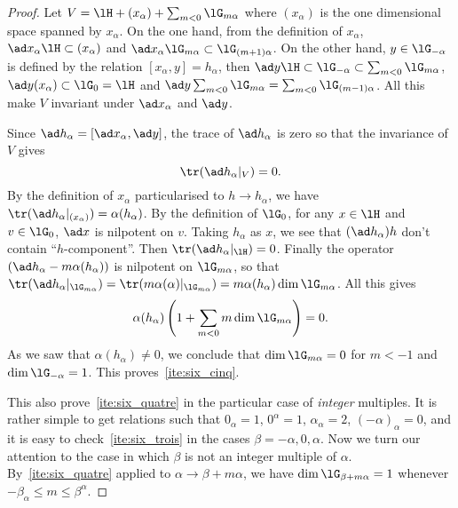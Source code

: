 \begin{proof}
Let $V=\lH+(x_{\alpha})+\sum_{m<0}\lG_{m\alpha}$ where $(x_{\alpha})$ is the one dimensional space spanned by $x_{\alpha}$. On the one hand,  from the definition of $x_{\alpha}$, $\ad x_{\alpha}\lH\subset(x_{\alpha})$ and $\ad x_{\alpha}\lG_{m\alpha}\subset\lG_{(m+1)\alpha}$. On the other hand, $y\in\lG_{-\alpha}$ is defined by the relation $[x_{\alpha},y]=h_{\alpha}$, then  $\ad y\lH\subset\lG_{-\alpha}\subset\sum_{m<0}\lG_{m\alpha}$, $\ad y(x_{\alpha})\subset\lG_0=\lH$ and $\ad y\sum_{m<0}\lG_{m\alpha}=\sum_{m<0}\lG_{(m-1)\alpha}$. All this make $V$ invariant under $\ad x_{\alpha}$ and $\ad y$.

Since $\ad h_{\alpha}=[\ad x_{\alpha},\ad y]$, the trace of $\ad h_{\alpha}$ is zero so that the invariance of $V$ gives
\[
\tr(\ad h_{\alpha}|_V)=0.
\]
By the definition of $x_{\alpha}$ particularised to $h\to h_{\alpha}$, we have $\tr(\ad h_{\alpha}|_{(x_{\alpha})})=\alpha(h_{\alpha})$. By the definition of $\lG_0$, for any $x\in\lH$ and $v\in\lG_0$, $\ad x$ is nilpotent on $v$. Taking $h_{\alpha}$ as $x$, we see that
$(\ad h_{\alpha})h$ don't contain ``$h$-component''. Then $\tr(\ad h_{\alpha}|_{\lH})=0$. Finally the operator $(\ad h_{\alpha}-m\alpha(h_{\alpha}))$ is nilpotent on $\lG_{m\alpha}$, so that $\tr(\ad h_{\alpha}|_{\lG_{m\alpha}})=\tr( m\alpha(\alpha)|_{\lG_{m\alpha}} )=m\alpha(h_{\alpha})\dim\lG_{m\alpha}$. All this gives
\begin{equation}
\alpha(h_{\alpha})\left( 1+\sum_{m<0}m\dim\lG_{m\alpha}  \right)=0.
\end{equation}
As we saw that $\alpha(h_{\alpha})\neq 0$, we conclude that $\dim\lG_{m\alpha}=0$ for $m<-1$ and $\dim\lG_{-\alpha}=1$. This proves~\ref{ite:six_cinq}.

This also prove~\ref{ite:six_quatre} in the particular case of \emph{integer} multiples. It is rather simple to get relations such that $0_{\alpha}=1$, $0^{\alpha}=1$, $\alpha_{\alpha}=2$, $(-\alpha)_{\alpha}=0$, and it is easy to check~\ref{ite:six_trois} in the cases $\beta=-\alpha,0,\alpha$. Now we turn our attention to the case in which $\beta$ is not an integer multiple of $\alpha$. By~\ref{ite:six_quatre} applied to $\alpha\to\beta+m\alpha$, we have $\dim\lG_{\beta+m\alpha}=1$ whenever $-\beta_{\alpha}\leq m\leq\beta^{\alpha}$.


\end{proof}
